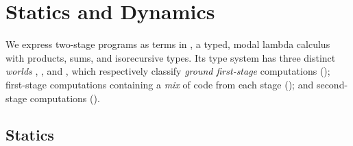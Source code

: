 
\section{\texorpdfstring{\lang}{λ12} Statics and Dynamics}
\label{sec:semantics}





We express two-stage programs as terms in \lang, a typed, modal lambda calculus
with products, sums, and isorecursive types. Its type system has three distinct
\emph{worlds} \bbonep, \bbonem, and \bbtwo, which respectively classify
\emph{ground first-stage} computations (\bbonep); 
first-stage computations containing a \emph{mix} of code from each stage
(\bbonem); 
and second-stage computations (\bbtwo).

\subsection{Statics}



